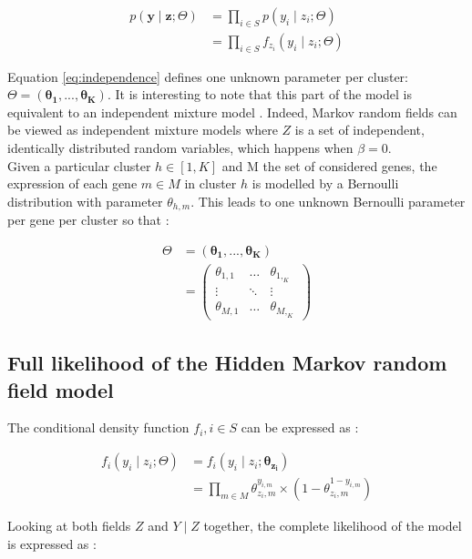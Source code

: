 \begin{align}
p(\boldsymbol{y} \mid \boldsymbol{z} ; \Theta) &= \prod_{i \in S} p(y_i \mid z_i ; \Theta) \nonumber\\
\label{eq:independence}
&= \prod_{i \in S} f_{z_i} (y_i \mid z_i ; \Theta)
\end{align}

Equation \ref{eq:independence} defines one unknown parameter per cluster: $\Theta = (\boldsymbol{\theta_1},...,\boldsymbol{\theta_K})$. It is interesting to note that this part of the model is equivalent to an independent mixture model \cite{mclachlan04}. Indeed, Markov random fields can be viewed as independent mixture models where $Z$ is a set of independent, identically distributed random variables, which happens when $\beta = 0$.\\

Given a particular cluster $h \in [1,K]$ and M the set of considered genes, the expression of each gene $m \in M$ in cluster $h$ is modelled by a Bernoulli distribution with parameter $\theta_{h,m}$. This leads to one unknown Bernoulli parameter per gene per cluster so that :

\begin{align*}
\Theta &= (\boldsymbol{\theta_1},...,\boldsymbol{\theta_K})\\
&= \left( \begin{array} {ccc}
\theta_{1,1} & \ldots  & \theta_{1,_K}\\
\vdots & \ddots & \vdots\\
\theta_{M,1} & \ldots & \theta_{M,_K} \end{array} \right)
\end{align*}

	\subsection{Full likelihood of the Hidden Markov random field model}

The conditional density function $f_i, i \in S$ can be expressed as :

\begin{align}
f_i(y_i \mid z_i ; \Theta) &= f_i(y_i \mid z_i ; \boldsymbol{\theta_{z_i}}) \nonumber\\ 
&= \prod_{m \in M} \theta_{z_i,m}^{y_{i,m}} \times (1-\theta_{z_i,m}^{1-y_{i,m}})
\end{align}

Looking at both fields $Z$ and $Y \mid Z$ together, the complete likelihood of the model is expressed as :

